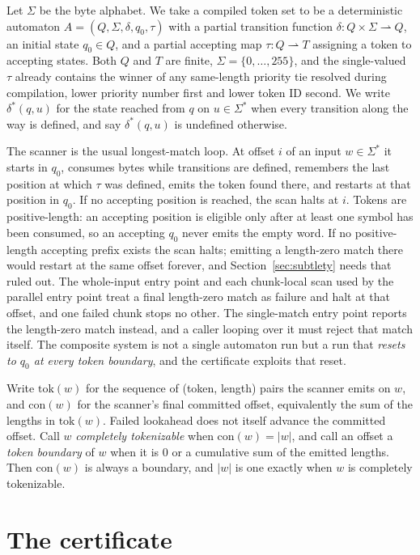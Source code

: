 \documentclass[11pt,a4paper]{article}
\theoremstyle{definition}
\theoremstyle{plain}
\begin{document}
Let $\Sigma$ be the byte alphabet. We take a compiled token set to be a deterministic automaton
$A = (Q, \Sigma, \delta, q_0, \tau)$ with a partial transition function $\delta : Q \times \Sigma \rightharpoonup Q$, an
initial state $q_0 \in Q$, and a partial accepting map $\tau : Q \rightharpoonup T$ assigning a token to accepting
states. Both $Q$ and $T$ are finite, $\Sigma = \{0, \ldots, 255\}$, and the single-valued $\tau$ already contains the
winner of any same-length priority tie resolved during compilation, lower priority number first and lower token ID
second. We write $\delta^*(q, u)$ for the state reached from $q$ on $u \in \Sigma^*$ when every transition along the way
is defined, and say $\delta^*(q,u)$ is undefined otherwise.

The scanner is the usual longest-match loop. At offset $i$ of an input $w \in \Sigma^*$ it starts in $q_0$, consumes
bytes while transitions are defined, remembers the last position at which $\tau$ was defined, emits the token found
there, and restarts at that position in $q_0$. If no accepting position is reached, the scan halts at $i$. Tokens are
positive-length: an accepting position is eligible only after at least one symbol has been consumed, so an accepting
$q_0$ never emits the empty word. If no positive-length accepting prefix exists the scan halts; emitting a length-zero
match there would restart at the same offset forever, and Section~\ref{sec:subtlety} needs that ruled out. The
whole-input entry point and each chunk-local scan used by the parallel entry point treat a final length-zero match as
failure and halt at that offset, and one failed chunk stops no other. The single-match entry point reports the
length-zero match instead, and a caller looping over it must reject that match itself. The composite system is not a
single automaton run but a run that \emph{resets to $q_0$ at every token boundary}, and the certificate exploits that
reset.

Write $\mathrm{tok}(w)$ for the sequence of (token, length) pairs the scanner emits on $w$, and $\mathrm{con}(w)$ for
the scanner's final committed offset, equivalently the sum of the lengths in $\mathrm{tok}(w)$. Failed lookahead does
not itself advance the committed offset. Call $w$ \emph{completely tokenizable} when $\mathrm{con}(w) = |w|$, and call
an offset a \emph{token boundary} of $w$ when it is $0$ or a cumulative sum of the emitted lengths. Then
$\mathrm{con}(w)$ is always a boundary, and $|w|$ is one exactly when $w$ is completely tokenizable.

\section{The certificate}
\label{sec:certificate}
\end{document}
